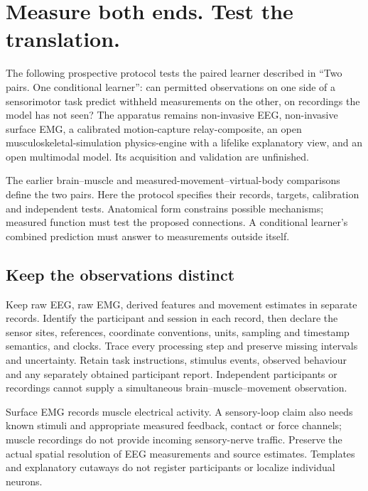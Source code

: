 \section{Measure both ends. Test the translation.}

The following prospective protocol tests the paired learner described in ``Two pairs. One conditional learner'': can permitted observations on one side of a sensorimotor task predict withheld measurements on the other, on recordings the model has not seen? The apparatus remains non-invasive EEG, non-invasive surface EMG, a calibrated motion-capture relay-composite, an open musculoskeletal-simulation physics-engine with a lifelike explanatory view, and an open multimodal model. Its acquisition and validation are unfinished.

The earlier brain--muscle and measured-movement--virtual-body comparisons define the two pairs. Here the protocol specifies their records, targets, calibration and independent tests. Anatomical form constrains possible mechanisms; measured function must test the proposed connections. A conditional learner's combined prediction must answer to measurements outside itself.

\subsection{Keep the observations distinct}

Keep raw EEG, raw EMG, derived features and movement estimates in separate
records. Identify the participant and session in each record, then declare the
sensor sites, references, coordinate conventions, units, sampling and timestamp
semantics, and clocks. Trace every processing step and preserve missing intervals and uncertainty. Retain task
instructions, stimulus events, observed behaviour and any separately obtained
participant report. Independent participants or recordings cannot supply a
simultaneous brain--muscle--movement observation.

Surface EMG records muscle electrical activity. A sensory-loop claim also needs
known stimuli and appropriate measured feedback, contact or force channels;
muscle recordings do not provide incoming sensory-nerve traffic. Preserve the
actual spatial resolution of EEG measurements and source estimates. Templates
and explanatory cutaways do not register participants or localize individual
neurons.

